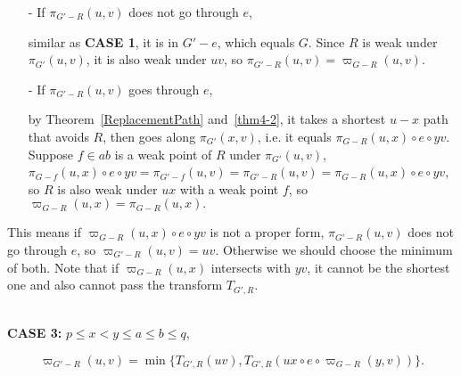 \documentclass[11pt]{article}
\theoremstyle{plain}
\theoremstyle{definition}
\newcommand{\new}[1]{\pi_{G'}(#1)}
\newcommand{\og}[3]{\pi_{G-#3}\left(#1,#2\right)}
\newcommand{\nng}[3]{\pi_{G'-#3}\left(#1,#2\right)}
\newcommand{\odg}[3]{\varpi_{G-#3}\left(#1,#2\right)}
\newcommand{\ndg}[3]{\varpi_{G'-#3}\left(#1,#2\right)}
\newcommand{\pp}[1]{T_{G',R}\left(#1\right)}
\begin{document}
\begin{itemize}
    \item[-] If $\nng{u}{v}{R}$ does not go through $e$,
    
\vspace{5pt}
 similar as \textbf{CASE 1}, it is in $G'-e$, which equals $G.$ Since $R$ is weak under $\new{u,v}$, it is also weak under $uv$, so $\nng{u}{v}{R}=\odg{u}{v}{R}$.

\vspace{5pt}
    \item[-] If $\nng{u}{v}{R}$ goes through $e$,
    
\vspace{5pt}
by Theorem~\ref{ReplacementPath} and~\ref{thm4-2}, it takes a shortest $u-x$ path that avoids $R$, then goes along $\new{x,v}$, i.e. it equals $\og{u}{x}{R}\circ e\circ yv.$ Suppose $f\in ab$ is a weak point of $R$ under $\new{u,v}$, $\og{u}{x}{f}\circ e\circ yv=\nng{u}{v}{f}=\nng{u}{v}{R}=\og{u}{x}{R}\circ e\circ yv$, so $R$ is also weak under $ux$ with a weak point $f$, so $\odg{u}{x}{R}=\og{u}{x}{R}.$
\vspace{5pt}
    
\end{itemize}

This means if $\odg{u}{x}{R}\circ e\circ yv$ is not a proper form, $\nng{u}{v}{R}$ does not go through $e$, so $\ndg{u}{v}{R}=uv.$ Otherwise we should choose the minimum of both. Note that if $\odg{u}{x}{R}$ intersects with $yv$, it cannot be the shortest one and also cannot pass the transform $T_{G',R}$.

~\\
\noindent\textbf{CASE 3:} $p\le x<y\le a\le b\le q$,

$$\ndg{u}{v}{R}=
    \min\{\pp{uv}, \pp{ux\circ e\circ\odg{y}{v}{R}}\}.
$$
\end{document}
